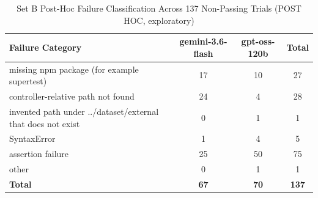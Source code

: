 \begin{table}[t]
\centering
\caption{Set B Post-Hoc Failure Classification Across 137 Non-Passing Trials (POST HOC, exploratory)}
\label{tab:setb_failures}
\begin{tabular}{lccc}
\toprule
\textbf{Failure Category} & \textbf{gemini-3.6-flash} & \textbf{gpt-oss-120b} & \textbf{Total} \\
\midrule
missing npm package (for example supertest) & 17 & 10 & 27 \\
controller-relative path not found & 24 & 4 & 28 \\
invented path under ../dataset/external that does not exist & 0 & 1 & 1 \\
SyntaxError & 1 & 4 & 5 \\
assertion failure & 25 & 50 & 75 \\
other & 0 & 1 & 1 \\
\midrule
\textbf{Total} & \textbf{67} & \textbf{70} & \textbf{137} \\
\bottomrule
\end{tabular}
\end{table}

